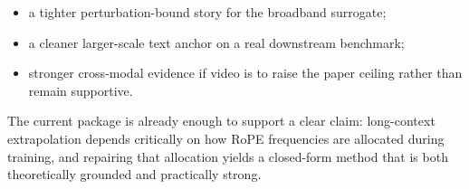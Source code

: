 \documentclass[11pt]{article}
\begin{document}
\begin{itemize}
  \item a tighter perturbation-bound story for the broadband surrogate;
  \item a cleaner larger-scale text anchor on a real downstream benchmark;
  \item stronger cross-modal evidence if video is to raise the paper ceiling rather than remain supportive.
\end{itemize}

The current package is already enough to support a clear claim: long-context
extrapolation depends critically on how RoPE frequencies are allocated during
training, and repairing that allocation yields a closed-form method that is
both theoretically grounded and practically strong.
\end{document}

